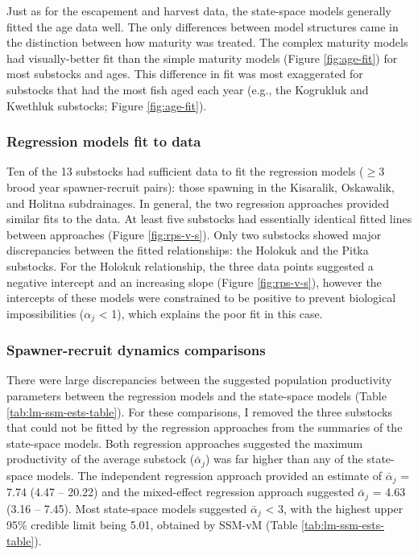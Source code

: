\documentclass[12pt,]{book}
\theoremstyle{definition}
\theoremstyle{definition}
\theoremstyle{definition}
\theoremstyle{remark}
\begin{document}
Just as for the escapement and harvest data, the state-space models
generally fitted the age data well. The only differences between model
structures came in the distinction between how maturity was treated. The
complex maturity models had visually-better fit than the simple maturity
models (Figure \ref{fig:age-fit}) for most substocks and ages. This
difference in fit was most exaggerated for substocks that had the most
fish aged each year (e.g., the Kogrukluk and Kwethluk substocks; Figure
\ref{fig:age-fit}).

\subsubsection{Regression models fit to data}\label{reg-fit}

\noindent
Ten of the 13 substocks had sufficient data to fit the regression models
(\(\ge 3\) brood year spawner-recruit pairs): those spawning in the
Kisaralik, Oskawalik, and Holitna subdrainages. In general, the two
regression approaches provided similar fits to the data. At least five
substocks had essentially identical fitted lines between approaches
(Figure \ref{fig:rps-v-s}). Only two substocks showed major
discrepancies between the fitted relationships: the Holokuk and the
Pitka substocks. For the Holokuk relationship, the three data points
suggested a negative intercept and an increasing slope (Figure
\ref{fig:rps-v-s}), however the intercepts of these models were
constrained to be positive to prevent biological impossibilities
(\(\alpha_j\) \textless{} 1), which explains the poor fit in this case.

\subsubsection{Spawner-recruit dynamics
comparisons}\label{spawner-recruit-dynamics-comparisons}

\noindent
There were large discrepancies between the suggested population
productivity parameters between the regression models and the
state-space models (Table \ref{tab:lm-ssm-ests-table}). For these
comparisons, I removed the three substocks that could not be fitted by
the regression approaches from the summaries of the state-space models.
Both regression approaches suggested the maximum productivity of the
average substock (\(\bar{\alpha}_j\)) was far higher than any of the
state-space models. The independent regression approach provided an
estimate of \(\bar{\alpha}_j\) = 7.74 (4.47 -- 20.22) and the
mixed-effect regression approach suggested \(\bar{\alpha}_j\) = 4.63
(3.16 -- 7.45). Most state-space models suggested \(\bar{\alpha}_j\)
\textless{} 3, with the highest upper 95\% credible limit being 5.01,
obtained by SSM-vM (Table \ref{tab:lm-ssm-ests-table}).
\end{document}
